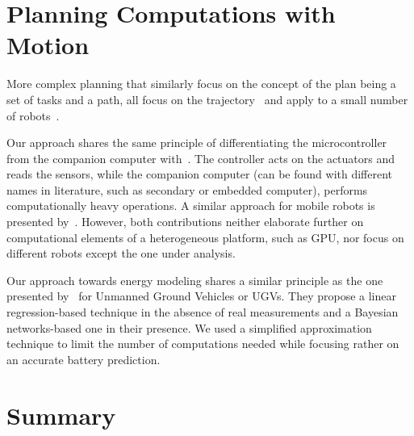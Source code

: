 

\section{\color{cyan}Planning Computations with Motion}
\label{sec:soa-comp-motion-pl}


More complex planning that similarly focus on the concept of the plan being a set of tasks and a path, all focus on the trajectory~\cite{mei2005case,mei2006deployment} and apply to a small number of robots~\cite{sadrpour2013mission,sadrpour2013experimental}.

Our approach shares the same principle of differentiating the microcontroller from the companion computer with~\citep{mei2004energy, mei2005case}. The controller acts on the actuators and reads the sensors, while the companion computer (can be found with different names in literature, such as secondary or embedded computer), performs computationally heavy operations. A similar approach for mobile robots is presented by~\citep{dressler2005energy}. However, both contributions neither elaborate further on computational elements of a heterogeneous platform, such as GPU, nor focus on different robots except the one under analysis.

Our approach towards energy modeling shares a similar principle as the one presented by~\citep{sadrpour2013mission, sadrpour2013experimental} for Unmanned Ground Vehicles or UGVs. They propose a linear regression-based technique in the absence of real measurements and a Bayesian networks-based one in their presence. We used a simplified approximation technique to limit the number of computations needed while focusing rather on an accurate battery prediction.

\section{\color{red}Summary}

